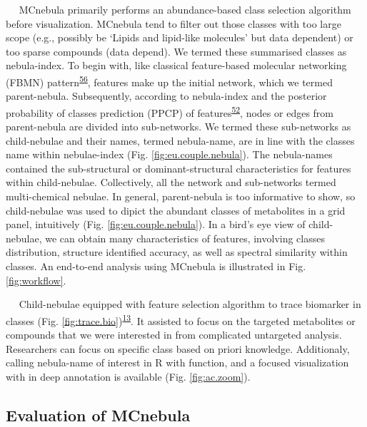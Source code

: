    MCnebula primarily performs an abundance-based class selection
algorithm before visualization. MCnebula tend to filter out those
classes with too large scope (e.g., possibly be `Lipids and lipid-like
molecules' but data dependent) or too sparse compounds (data depend). We
termed these summarised classes as nebula-index. To begin with, like
classical feature-based molecular networking (FBMN)
pattern\textsuperscript{\protect\hyperlink{ref-2020d}{56}}, features
make up the initial network, which we termed parent-nebula.
Subsequently, according to nebula-index and the posterior probability of
classes prediction (PPCP) of
features\textsuperscript{\protect\hyperlink{ref-2021a}{52}}, nodes or
edges from parent-nebula are divided into sub-networks. We termed these
sub-networks as child-nebulae and their names, termed nebula-name, are
in line with the classes name within nebulae-index (Fig.
{\protect\NoHyper\ref{fig:eu.couple.nebula}\protect\endNoHyper}). The
nebula-names contained the sub-structural or dominant-structural
characteristics for features within child-nebulae. Collectively, all the
network and sub-networks termed multi-chemical nebulae. In general,
parent-nebula is too informative to show, so child-nebulae was used to
dipict the abundant classes of metabolites in a grid panel, intuitively
(Fig. {\protect\NoHyper\ref{fig:eu.couple.nebula}\protect\endNoHyper}).
In a bird's eye view of child-nebulae, we can obtain many
characteristics of features, involving classes distribution, structure
identified accuracy, as well as spectral similarity within classes. An
end-to-end analysis using MCnebula is illustrated in Fig.
{\protect\NoHyper\ref{fig:workflow}\protect\endNoHyper}.

   Child-nebulae equipped with feature selection algorithm to trace
biomarker in classes (Fig.
{\protect\NoHyper\ref{fig:trace.bio}\protect\endNoHyper})\textsuperscript{\protect\hyperlink{ref-2017i}{13}}.
It assisted to focus on the targeted metabolites or compounds that we
were interested in from complicated untargeted analysis. Researchers can
focus on specific class based on priori knowledge. Additionaly, calling
nebula-name of interest in R with function, and a focused visualization
with in deep annotation is available (Fig.
{\protect\NoHyper\ref{fig:ac.zoom}\protect\endNoHyper}).

\hypertarget{evaluation-of-mcnebula}{%
\subsection{\texorpdfstring{\textbf{Evaluation of
MCnebula}}{Evaluation of MCnebula}}\label{evaluation-of-mcnebula}}

